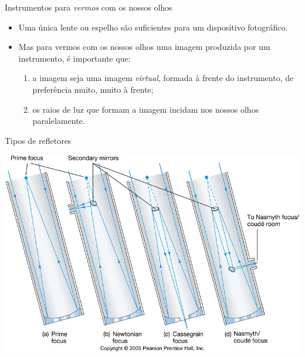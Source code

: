 \documentclass[beamer,9pt,aspectratio=169]{beamer}
\begin{document}
\begin{frame}{Instrumentos para \emph{vermos} com os nossos olhos}
  \begin{itemize}
        \setlength{\itemsep}{2em}
    \item Uma única lente ou espelho são suficientes para um dispositivo
      fotográfico.
    \item Mas para vermos com os nossos olhos uma imagem produzida
      por um instrumento, é importante que:
      \vspace{1em}
      \begin{enumerate}
        \setlength{\itemsep}{1em}
        \item a imagem seja uma imagem \emph{virtual}, formada à frente do
          instrumento, de preferência muito, muito à frente;
        \item os raios de luz que formam a imagem incidam nos nossos olhos
          paralelamente.
      \end{enumerate}
      \vspace{1em}

      \vspace{1em}

  \end{itemize}
\end{frame}
\begin{frame}{Tipos de refletores}
  \begin{center}
  \includegraphics[width=0.6\linewidth]{figs/newtcasscoud.jpg}
  \end{center}
  \vspace{2em}
  \pause
\end{frame}
\end{document}
